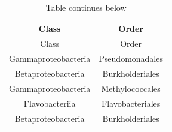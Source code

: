 \documentclass[]{article}
\begin{document}
\begin{longtable}[]{@{}cc@{}}
\caption{Table continues below}\tabularnewline
\toprule
\begin{minipage}[b]{0.31\columnwidth}\centering\strut
Class\strut
\end{minipage} & \begin{minipage}[b]{0.43\columnwidth}\centering\strut
Order\strut
\end{minipage}\tabularnewline
\midrule
\endfirsthead
\toprule
\begin{minipage}[b]{0.31\columnwidth}\centering\strut
Class\strut
\end{minipage} & \begin{minipage}[b]{0.43\columnwidth}\centering\strut
Order\strut
\end{minipage}\tabularnewline
\midrule
\endhead
\begin{minipage}[t]{0.31\columnwidth}\centering\strut
Gammaproteobacteria\strut
\end{minipage} & \begin{minipage}[t]{0.43\columnwidth}\centering\strut
Pseudomonadales\strut
\end{minipage}\tabularnewline
\begin{minipage}[t]{0.31\columnwidth}\centering\strut
Betaproteobacteria\strut
\end{minipage} & \begin{minipage}[t]{0.43\columnwidth}\centering\strut
Burkholderiales\strut
\end{minipage}\tabularnewline
\begin{minipage}[t]{0.31\columnwidth}\centering\strut
Gammaproteobacteria\strut
\end{minipage} & \begin{minipage}[t]{0.43\columnwidth}\centering\strut
Methylococcales\strut
\end{minipage}\tabularnewline
\begin{minipage}[t]{0.31\columnwidth}\centering\strut
Flavobacteriia\strut
\end{minipage} & \begin{minipage}[t]{0.43\columnwidth}\centering\strut
Flavobacteriales\strut
\end{minipage}\tabularnewline
\begin{minipage}[t]{0.31\columnwidth}\centering\strut
Betaproteobacteria\strut
\end{minipage} & \begin{minipage}[t]{0.43\columnwidth}\centering\strut
Burkholderiales\strut
\end{minipage}\tabularnewline

\end{longtable}
\end{document}
